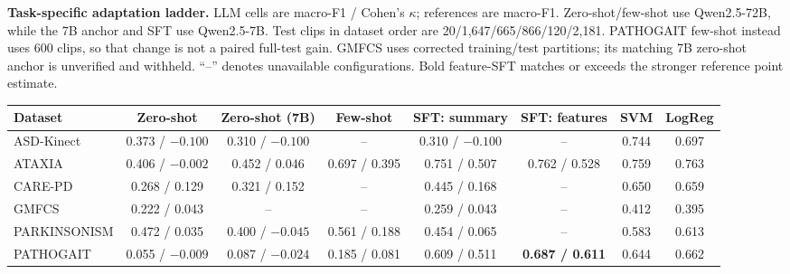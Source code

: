 \begin{importtable}
\centering
\caption{\textbf{Task-specific adaptation ladder.} LLM cells are macro-F1 / Cohen's $\kappa$; references are macro-F1. Zero-shot/few-shot use Qwen2.5-72B, while the 7B anchor and SFT use Qwen2.5-7B. Test clips in dataset order are 20/1,647/665/866/120/2,181. PATHOGAIT few-shot instead uses 600 clips, so that change is not a paired full-test gain. GMFCS uses corrected training/test partitions; its matching 7B zero-shot anchor is unverified and withheld. ``--'' denotes unavailable configurations. Bold feature-SFT matches or exceeds the stronger reference point estimate.}
\label{v2detail:tab:adaptation_ladder}
\small
\setlength{\tabcolsep}{4.2pt}
\begin{adjustbox}{max width=\linewidth}
\begin{tabular*}{\textwidth}{@{\extracolsep{\fill}}lccccccc@{}}
\toprule
\textbf{Dataset}
& \textbf{Zero-shot}
& \textbf{Zero-shot (7B)}
& \textbf{Few-shot}
& \textbf{SFT: summary}
& \textbf{SFT: features}
& \textbf{SVM}
& \textbf{LogReg} \\
\midrule
ASD-Kinect
& 0.373 / $-0.100$
& 0.310 / $-0.100$
& --
& 0.310 / $-0.100$
& --
& 0.744
& 0.697 \\

ATAXIA
& 0.406 / $-0.002$
& 0.452 / 0.046
& 0.697 / 0.395
& 0.751 / 0.507
& 0.762 / 0.528
& 0.759
& 0.763 \\

CARE-PD
& 0.268 / 0.129
& 0.321 / 0.152
& --
& 0.445 / 0.168
& --
& 0.650
& 0.659 \\

GMFCS
& 0.222 / 0.043
& --
& --
& 0.259 / 0.043
& --
& 0.412
& 0.395 \\
PARKINSONISM
& 0.472 / 0.035
& 0.400 / $-0.045$
& 0.561 / 0.188
& 0.454 / 0.065
& --
& 0.583
& 0.613 \\

PATHOGAIT
& 0.055 / $-0.009$
& 0.087 / $-0.024$
& 0.185 / 0.081
& 0.609 / 0.511
& \textbf{0.687 / 0.611}
& 0.644
& 0.662 \\

\bottomrule
\end{tabular*}
\end{adjustbox}
\end{importtable}
